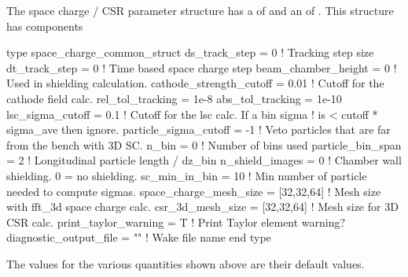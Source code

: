 {The space charge / CSR parameter structure has a  of 
and an  of . This structure has components
\begin{example}
  type space_charge_common_struct 
    ds_track_step = 0                   ! Tracking step size
    dt_track_step = 0                   ! Time based space charge step
    beam_chamber_height = 0             ! Used in shielding calculation.
    cathode_strength_cutoff = 0.01      ! Cutoff for the cathode field calc.
    rel_tol_tracking = 1e-8
    abs_tol_tracking = 1e-10            
    lsc_sigma_cutoff = 0.1              ! Cutoff for the lsc calc. If a bin sigma
                                        !  is < cutoff * sigma_ave then ignore.
    particle_sigma_cutoff = -1          ! Veto particles that are far from the bench with 3D SC.
    n_bin = 0                           ! Number of bins used
    particle_bin_span = 2               ! Longitudinal particle length / dz_bin
    n_shield_images = 0                 ! Chamber wall shielding. 0 = no shielding.
    sc_min_in_bin = 10                  ! Min number of particle needed to compute sigmas.
    space_charge_mesh_size = [32,32,64] ! Mesh size with fft_3d space charge calc.
    csr_3d_mesh_size = [32,32,64]       ! Mesh size for 3D CSR calc.
    print_taylor_warning = T            ! Print Taylor element warning?
    diagnostic_output_file = ""         ! Wake file name
  end type
\end{example}
The values for the various quantities shown above are their default values. 

}
